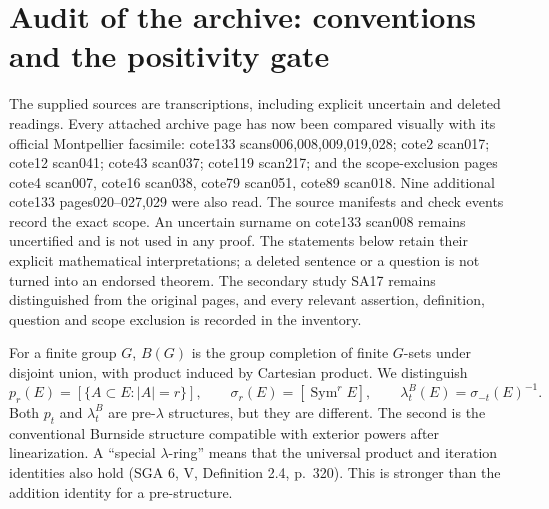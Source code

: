 \section{Audit of the archive: conventions and the positivity gate}
The supplied sources are transcriptions, including explicit uncertain and
deleted readings. Every attached archive page has now been compared visually
with its official Montpellier facsimile: cote133 scans006,008,009,019,028;
cote2 scan017; cote12 scan041; cote43 scan037; cote119 scan217; and the
scope-exclusion pages cote4 scan007, cote16 scan038, cote79 scan051,
cote89 scan018. Nine additional cote133 pages020--027,029 were also read.
The source manifests and check events record the exact scope. An uncertain
surname on cote133 scan008 remains uncertified and is not used in any proof.
The statements below retain their explicit mathematical interpretations;
a deleted sentence or a question is not turned into an endorsed theorem.
The secondary study SA17 remains distinguished from the original pages,
and every relevant assertion, definition, question and scope exclusion is
recorded in the inventory.

For a finite group $G$, $B(G)$ is the group completion of finite $G$-sets under
disjoint union, with product induced by Cartesian product.  We distinguish
\[
 p_r(E)=[\{A\subset E:|A|=r\}],\qquad
 \sigma_r(E)=[\operatorname{Sym}^rE],\qquad
 \lambda_t^B(E)=\sigma_{-t}(E)^{-1}.
\]
Both $p_t$ and $\lambda_t^B$ are pre-$\lambda$ structures, but they are different.
The second is the conventional Burnside structure compatible with exterior
powers after linearization.  A ``special $\lambda$-ring'' means that the
universal product and iteration identities also hold (SGA 6, V, Definition
2.4, p.~320).  This is stronger than the addition identity for a pre-structure.

